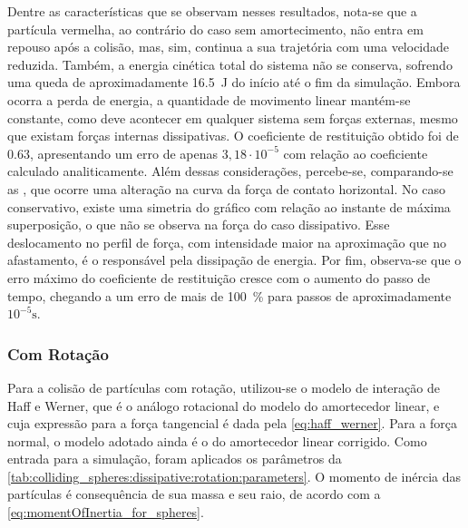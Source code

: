 Dentre as características que se observam nesses resultados, nota-se que a partícula vermelha, ao contrário do caso sem amortecimento, não entra em repouso após a colisão, mas, sim, continua a sua trajetória com uma velocidade reduzida. Também, a energia cinética total do sistema não se conserva, sofrendo uma queda de aproximadamente \SI{16,5}{\joule} do início até o fim da simulação. Embora ocorra a perda de energia, a quantidade de movimento linear mantém-se constante, como deve acontecer em qualquer sistema sem forças externas, mesmo que existam forças internas dissipativas. O coeficiente de restituição obtido foi de \SI{0,63}{}, apresentando um erro de apenas \(3,18\cdot 10^{-5}\) com relação ao coeficiente calculado analiticamente. Além dessas considerações, percebe-se, comparando-se as  , que ocorre uma alteração na curva da força de contato horizontal. No caso conservativo, existe uma simetria do gráfico com relação ao instante de máxima superposição, o que não se observa na força do caso dissipativo. Esse deslocamento no perfil de força, com intensidade maior na aproximação que no afastamento, é o responsável pela dissipação de energia. Por fim, observa-se que o erro máximo do coeficiente de restituição cresce com o aumento do passo de tempo, chegando a um erro de mais de \SI{100}{\percent} para passos de aproximadamente \(10^{-5}\si{\second}\).

\subsubsection{Com Rotação}

Para a colisão de partículas com rotação, utilizou-se o modelo de interação de Haff e Werner, que é o análogo rotacional do modelo do amortecedor linear, e cuja expressão para a força tangencial é dada pela \cref{eq:haff_werner}. Para a força normal, o modelo adotado ainda é o do amortecedor linear corrigido. Como entrada para a simulação, foram aplicados os parâmetros da \cref{tab:colliding_spheres:dissipative:rotation:parameters}. O momento de inércia das partículas é consequência de sua massa e seu raio, de acordo com a \cref{eq:momentOfInertia_for_spheres}.

